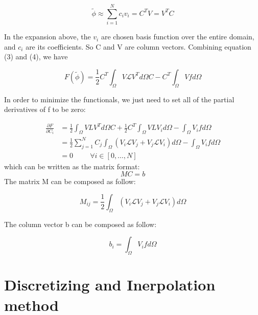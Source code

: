 \documentclass[journal]{IEEEtran}
\begin{document}
\begin{equation}
\widetilde{\phi} \approx \sum_{i=1}^{N} c_i v_i = C^T V = V^T C 
\end{equation}

In the expansion above, the $v_i$ are chosen basis function over the entire domain, and $c_i$ are its coefficients. So C and V are column vectors. Combining equation (3) and (4), we have

\begin{equation}
F(\widetilde{\phi}) = \frac{1}{2}C^T \int_{\Omega}V \mathcal{L} V^T d\Omega C - C^T \int_{\Omega} V f d\Omega
\end{equation}

In order to minimize the functionals, we just need to set all of the partial derivatives of f to be zero:

\begin{equation}
\begin{split}
\frac{\partial F}{\partial C_i} & = \frac{1}{2} \int_{\Omega}V L V^T d\Omega C + \frac{1}{2} C^T \int_\Omega V L V_i d\Omega - \int_{\Omega}V_i f d\Omega\\
& = \frac{1}{2} \sum_{j=1}^{N} C_j \int_{\Omega} (V_i \mathcal{L} V_j + V_j \mathcal{L} V_i ) d\Omega - \int_\Omega V_i f d\Omega \\
& = 0 \hspace{1cm} \forall i \in [0,\dots,N]
\end{split}\end{equation}
which can be written as the matrix format:
\begin{equation}
MC = b
\end{equation}
The matrix M can be composed as follow:

\begin{equation}
M_{ij} = \frac{1}{2} \int_{\Omega}(V_i \mathcal{L} V_j + V_j \mathcal{L} V_i) d\Omega
\end{equation}

The column vector b can be composed as follow:

\begin{equation}
b_i = \int_{\Omega} V_i f d\Omega
\end{equation}



\section{Discretizing and Inerpolation  method}
\end{document}
